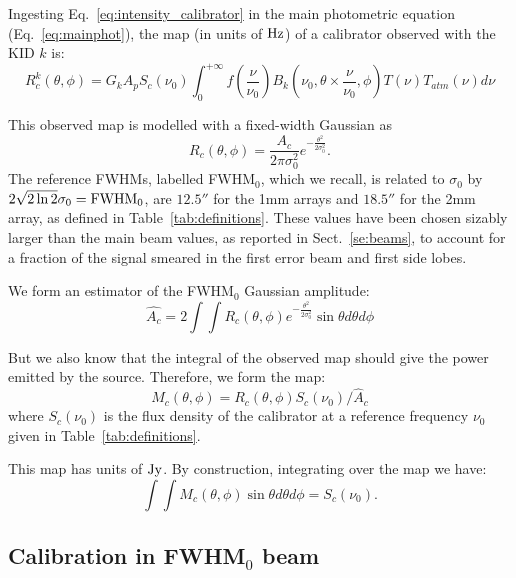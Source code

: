 Ingesting Eq.~\ref{eq:intensity_calibrator} in the main photometric
equation (Eq.~\ref{eq:mainphot}), the map (in units of $\rm Hz$) of a
calibrator observed with the KID $k$ is:
\begin{equation}
R_{c}^{k}(\theta, \phi) =  G_{k} A_{p} S_{c} (\nu_{0})  \int_{0}^{+\infty}
f(\frac{\nu}{\nu_{0}}) B_{k}(\nu_{0}, \theta \times \frac{\nu}{\nu_{0}},
\phi) T(\nu) T_{atm}(\nu) d\nu
\label{eq:mainbeammap}
\end{equation}

This observed map is modelled with a fixed-width Gaussian as 
\begin{equation} 
R_{c}(\theta, \phi)  = \frac{A_{c}}{2 \pi \sigma_{0}^{2}}
e^{-\frac{\theta^{2}}{2\sigma_{0}^{2}}}.
\label{eq:calfwhm0}
\end{equation}
The reference FWHMs, labelled FWHM$_{0}$, which we recall, is related
to $\sigma_{0}$ by $2 \sqrt{2\ln{2}} \sigma_{0} = {\rm FWHM}_{0}$,
are $12.5''$ for the 1mm arrays and $18.5''$ for the 2mm
array, as defined in Table~\ref{tab:definitions}. These values have
been chosen sizably larger than the main beam values, as reported in
Sect.~\ref{se:beams}, to account for a fraction of the signal smeared 
in the first error beam and first side lobes.


We form an estimator of the FWHM$_{0}$ Gaussian amplitude:
\begin{equation} 
\hat{A_{c}}  = 2 \int \int R_{c}(\theta, \phi)e^{-\frac{\theta^{2}}{2\sigma_{0}^{2}}} \sin \theta d\theta d\phi
\label{eq:fixed-width-gaussian-estimator}
\end{equation}

But we also know that the integral of the observed map should give the power
emitted by the source. Therefore, we form the map:
\begin{equation}
M_{c}(\theta, \phi) = R_{c}(\theta, \phi)   S_{c} (\nu_{0}) / \hat{A}_{c}
\end{equation}
where  $S_{c} (\nu_{0})$ is the flux density of the calibrator
at a reference frequency $\nu_{0}$ given in Table~\ref{tab:definitions}.

This map has units of $\rm Jy$. By construction, integrating over the map we have:
\begin{equation}
\int\int M_{c}(\theta, \phi) \sin \theta d\theta d\phi = S_{c}(\nu_{0}).
\end{equation}



\subsection{Calibration in FWHM$_{0}$ beam}
\label{se:flux_density_equation}

